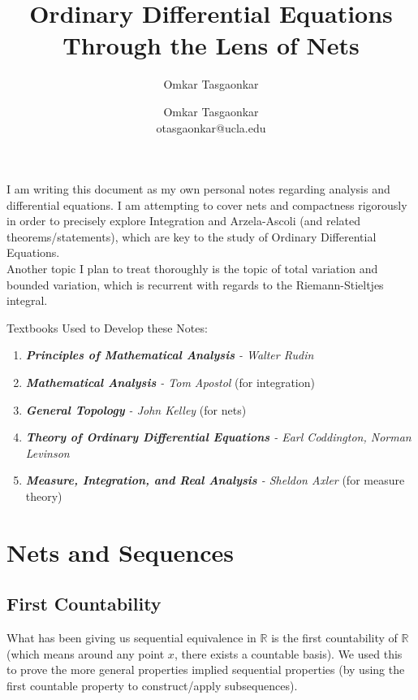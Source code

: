 \documentclass[10pt,letterpaper]{article} %
\author{Omkar Tasgaonkar}
\title{Ordinary Differential Equations \\[0.5em] \large Through the Lens of Nets}
\author{Omkar Tasgaonkar \\ \small otasgaonkar@ucla.edu}
\date{}
\begin{document}
\maketitle
I am writing this document as my own personal notes regarding analysis and differential equations. I am attempting to cover nets and compactness rigorously in order to precisely explore Integration and Arzela-Ascoli (and related theorems/statements), which are key to the study of Ordinary Differential Equations.\\

Another topic I plan to treat thoroughly is the topic of total variation and bounded variation, which is recurrent with regards to the Riemann-Stieltjes integral.\\

\begin{tcolorbox}[colback=white, colframe=black, arc=0mm]
Textbooks Used to Develop these Notes:
\begin{enumerate}
\item \textit{\textbf{Principles of Mathematical Analysis} - Walter Rudin}
\item \textit{\textbf{Mathematical Analysis} - Tom Apostol} (for integration)
\item \textit{\textbf{General Topology} - John Kelley} (for nets)
\item \textit{\textbf{Theory of Ordinary Differential Equations} - Earl Coddington, Norman Levinson}
\item \textit{\textbf{Measure, Integration, and Real Analysis} - Sheldon Axler} (for measure theory)
\end{enumerate}
\end{tcolorbox}
\thispagestyle{firstpage}
\newpage
\begin{tcolorbox}[colback=white, colframe=black, arc=0mm]
\tableofcontents
\end{tcolorbox}
\setcounter{section}{-1}

\pagebreak

\section{Nets and Sequences}

\subsection{First Countability}
What has been giving us sequential equivalence in $\mathbb{R}$ is the first countability of $\mathbb{R}$ (which means around any point $x$, there exists a countable basis). We used this to prove the more general properties implied sequential properties (by using the first countable property to construct/apply subsequences).\\
\end{document}
